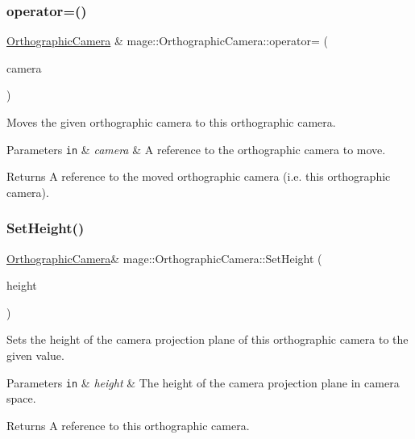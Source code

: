 \subsubsection{\texorpdfstring{operator=()}{operator=()}\hspace{0.1cm}{\footnotesize\ttfamily [2/2]}}
{\footnotesize\ttfamily \hyperlink{classmage_1_1_orthographic_camera}{Orthographic\+Camera} \& mage\+::\+Orthographic\+Camera\+::operator= (\begin{DoxyParamCaption}\item[{\hyperlink{classmage_1_1_orthographic_camera}{Orthographic\+Camera} \&\&}]{camera }\end{DoxyParamCaption})\hspace{0.3cm}{\ttfamily [default]}}

Moves the given orthographic camera to this orthographic camera.


\begin{DoxyParams}[1]{Parameters}
\mbox{\tt in}  & {\em camera} & A reference to the orthographic camera to move. \\
\hline
\end{DoxyParams}
\begin{DoxyReturn}{Returns}
A reference to the moved orthographic camera (i.\+e. this orthographic camera). 
\end{DoxyReturn}
\hypertarget{classmage_1_1_orthographic_camera_a57cb23f7bee15791f6a73a1244815614}{}\label{classmage_1_1_orthographic_camera_a57cb23f7bee15791f6a73a1244815614} 
\subsubsection{\texorpdfstring{Set\+Height()}{SetHeight()}}
{\footnotesize\ttfamily \hyperlink{classmage_1_1_orthographic_camera}{Orthographic\+Camera}\& mage\+::\+Orthographic\+Camera\+::\+Set\+Height (\begin{DoxyParamCaption}\item[{float}]{height }\end{DoxyParamCaption})}

Sets the height of the camera projection plane of this orthographic camera to the given value.


\begin{DoxyParams}[1]{Parameters}
\mbox{\tt in}  & {\em height} & The height of the camera projection plane in camera space. \\
\hline
\end{DoxyParams}
\begin{DoxyReturn}{Returns}
A reference to this orthographic camera. 
\end{DoxyReturn}
\hypertarget{classmage_1_1_orthographic_camera_a10e09af47e741ab76dc2aa2a03f04c06}{}\label{classmage_1_1_orthographic_camera_a10e09af47e741ab76dc2aa2a03f04c06} 
